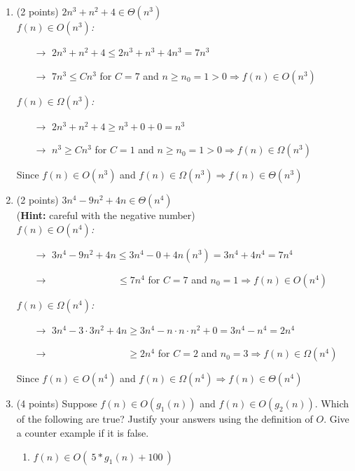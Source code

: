 \documentclass[12pt]{elsart}
\begin{document}
\begin{enumerate}
   \item (2 points) $2n^3+n^2+4\in \Theta(n^3)$\\
		\textit{$f(n)\in O(n^3)$:}
		\begin{itemize}
		\item[$\rightarrow$] $2n^3 + n^2 + 4 \leq 2n^3 + n^3 + 4n^3 = 7n^3$
		\item[$\rightarrow$] $7n^3 \leq Cn^3$ for $C = 7$ and $n \geq n_{0} = 1 > 0 \Rightarrow f(n)\in O(n^3)$
		\end{itemize}
		\textit{$f(n)\in \Omega(n^3)$:}
		\begin{itemize}
		\item[$\rightarrow$] $2n^3 + n^2 + 4 \geq n^3 + 0 + 0 = n^3$
		\item[$\rightarrow$] $n^3 \geq Cn^3$ for $C = 1$ and $n \geq n_{0} = 1 > 0 \Rightarrow f(n)\in \Omega(n^3)$
		\end{itemize}
		Since $f(n)\in O(n^3)$ and $f(n)\in \Omega(n^3) \Rightarrow f(n)\in \Theta(n^3)$
   \item (2 points) $3n^4-9n^2+4n\in \Theta(n^4)$\\  ({\bf Hint:} careful with the negative number)\\
		\textit{$f(n)\in O(n^4)$:}
		\begin{itemize}
		\item[$\rightarrow$] $3n^4 - 9n^2 + 4n \leq 3n^4 - 0 + 4n(n^3) = 3n^4 + 4n^4 = 7n^4$
		\item[$\rightarrow$] \verb!             !$\leq 7n^4$ for $C = 7$ and $n_0 = 1 \Rightarrow f(n)\in O(n^4)$
		\end{itemize}
		\textit{$f(n)\in \Omega(n^4)$:}
		\begin{itemize}
		\item[$\rightarrow$] $3n^4 - 3 \cdot 3n^2 + 4n \geq 3n^4 - n \cdot n \cdot n^2 + 0 = 3n^4 - n^4 = 2n^4$
		\item[$\rightarrow$] \verb!               !$\geq 2n^4$ for $C = 2$ and $n_0 = 3 \Rightarrow f(n)\in \Omega(n^4)$
		\end{itemize}
		Since $f(n)\in O(n^4)$ and $f(n)\in \Omega(n^4) \Rightarrow f(n)\in \Theta(n^4)$
   \item (4 points) Suppose $f(n)\in O(g_1(n))$ and $f(n)\in O(g_2(n))$.  Which of the following are true?  Justify your answers using the definition of $O$.  Give a counter example if it is false.
\begin{enumerate}
   \item $f(n)\in O( \ 5*g_1(n)+100\ )$

\end{enumerate}
\end{enumerate}
\end{document}
